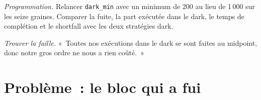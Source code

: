 \begin{exercise}[$\star\star\star$]\label{exo:mx:dark-pools-and-blocks:7}
\emph{Programmation.} Relancer \texttt{dark\_min} avec un minimum de 200 au lieu de 1\,000 sur les seize graines. Comparer la fuite, la part exécutée dans le dark,
le temps de complétion et le shortfall avec les deux stratégies dark.
\end{exercise}

\begin{exercise}[$\star\star\star$]\label{exo:mx:dark-pools-and-blocks:8}
\emph{Trouver la faille.} «~Toutes nos exécutions dans le dark se sont faites au midpoint, donc notre gros ordre ne nous a rien coûté.~»
\end{exercise}

\section{Problème~: le bloc qui a fui}

